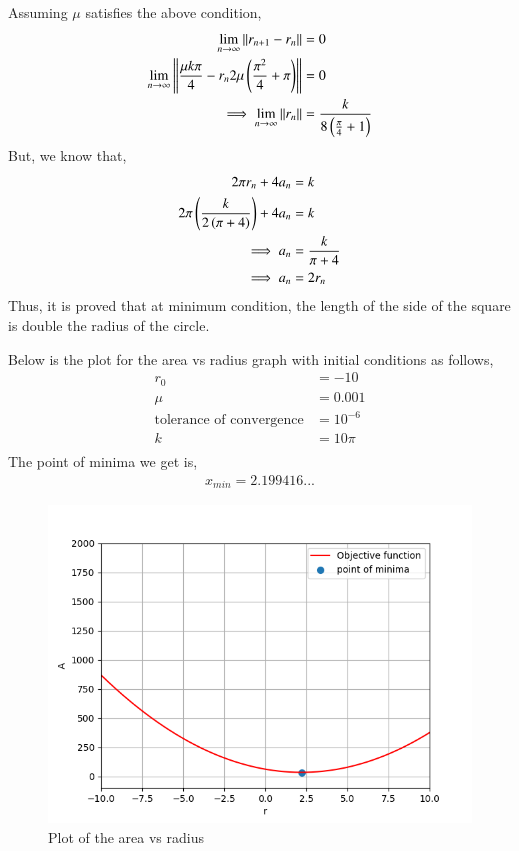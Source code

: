 \documentclass[journal]{IEEEtran}
\begin{document}
Assuming $\mu$ satisfies the above condition,
\begin{align}
	\lim_{n\to\infty}\left\lVert r_{n+1} - r_n\right\rVert &= 0\\
	\lim_{n\to\infty}\left\lVert\frac{\mu k\pi}{4} - r_n2\mu\left(\frac{\pi^2}{4} + \pi\right)\right\rVert &= 0\\
	\implies \lim_{n\to\infty}\left\lVert r_n\right\rVert &= \frac{k}{8\left(\frac{\pi}{4} + 1\right)}
\end{align}
But, we know that,
\begin{align}
	2\pi r_n + 4a_n &= k\\
	2\pi \left(\frac{k}{2\left(\pi + 4\right)}\right) + 4a_n &= k\\
	\implies a_n &= \frac{k}{\pi + 4}\\
	\implies a_n &= 2r_n
\end{align}
Thus, it is proved that at minimum condition, the length of the side of the square is double the radius of the circle.

Below is the plot for the area vs radius graph with initial conditions as follows,
\begin{align}
	r_0 &= -10\\
	\mu &= 0.001\\
	\text{tolerance of convergence} &= 10^{-6}\\
	k &= 10\pi\\
\end{align}
The point of minima we get is,
\begin{align}
	x_{min} = 2.199416...
\end{align}

\begin{figure}[h!]
	\centering
	\includegraphics[width=1\columnwidth]{figs/simulated.png}
	\caption{Plot of the area vs radius}
	\label{stemplot}
\end{figure}
\end{document}
